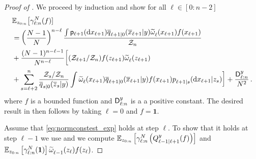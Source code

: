 \begin{proof}[Proof of ]
    We proceed by induction and show for all $\ell \in [0:n-2]$ 
\begin{equation}
    \begin{aligned} 
        \label{eq:normconstest_exp}
     & \pE_{z_{0:n}}\big[ \normconstest{\ell:n}(f) ] \\
     & = \left( \frac{N-1}{N} \right)^{n-\ell} \frac{\int \bwmarg{\ell+1}{\rmd x_{\ell+1}} \tfwtrans{\ell+1|0}{\lmeas}{\ltopstate_{\ell+1}} \uweight{}{\ell}(x_{\ell+1}) f(x_{\ell+1})}{\normconst_{n}}  \\
     & + \frac{(N-1)^{n-\ell-1}}{N^{n-\ell}} \bigg[ (\normconst_{\ell+1} / \normconst_n)f(z_{\ell+1}) \uweight{}{\ell}(z_{\ell+1}) \\
     & + \sum_{s=\ell+2} ^n \frac{\normconst_s / \normconst_n}{\tfwtrans{s|0}{\lmeas}{\overline{z}_s}} \int \uweight{}{\ell}(x_{\ell+1}) \tfwtrans{\ell+1|0}{\lmeas}{\ltopstate_{\ell+1}} f(x_{\ell+1}) \bwtrans{}{\ell+1|s}{z_s}{\rmd x_{\ell+1}}\bigg] + \frac{\mathsf{D}^\lmeas _{\ell:n}}{N^2} \eqsp.
    \end{aligned}
\end{equation}
where $f$ is a bounded function and  $\mathsf{D}^y _{\ell:n}$ is a a positive constant. 
    The desired result in  then follows by taking $\ell = 0$ and $f = \mathbf{1}$.


    Assume that \eqref{eq:normconstest_exp} holds at step $\ell$. To show that it holds at step $\ell-1$ we use  and we compute $\mathbb{E}_{z_{0:n}} \left[ \gamma^N _{\ell:n}\left( Q_{\ell-1|\ell+1} ^{y}(f)\right)\right]$ and $\mathbb{E}_{z_{0:n}} \left[ \gamma^N _{\ell:n}(\mathbf{1}) \right] \widetilde{\omega}^{} _{\ell-1}( z_{\ell}) f(z_{\ell})$. 
    

\end{proof}

